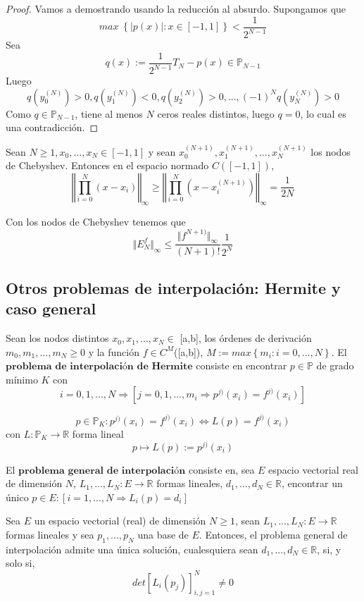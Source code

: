 \begin{proof}
Vamos a demostrando usando la reducción al absurdo. Supongamos que
\[ max \; \left\lbrace \vert p(x) \vert : x \in \left[ -1,1 \right] \right\rbrace < \frac{1}{2^{N-1}}\]
Sea
\[ q(x) := \frac{1}{2^{N-1}} T_N - p(x) \in \mathbb{P}_{N-1} \]
Luego
\[ q(y_0^{(N)}) >0, q(y_1^{(N)})<0, q(y_2^{(N)})>0, ..., (-1)^Nq(y_N^{(N)})>0 \]
Como $q \in \mathbb{P}_{N-1}$, tiene al menos $N$ ceros reales distintos, luego $q=0$, lo cual es una contradicción.
\end{proof}

\begin{ncor}
Sean $N \geq 1, x_0,...,x_N \in \left[ -1,1 \right]$ y sean $x_0^{(N+1)}, x_1^{(N+1)},...,x_N^{(N+1)}$ los nodos de Chebyshev. Entonces en el espacio normado $C( \left[ -1,1 \right] )$,
\[ \left\Vert \prod_{i=0}^N (x-x_i) \right\Vert _\infty \geq \left\Vert \prod_{i=0}^N (x-x_i^{(N+1)} ) \right\Vert _\infty = \frac{1}{2N} \]
\end{ncor}

Con los nodos de Chebyshev tenemos que
\[ \Vert E_N^f \Vert _\infty \leq \frac{\Vert f^{N+1)} \Vert _\infty}{(N+1)!} \frac{1}{2^N} \]

\subsection{Otros problemas de interpolación: Hermite y caso general}
Sean los nodos distintos $x_0,x_1,...,x_N \in$ [a,b], los órdenes de derivación $m_0,m_1,...,m_N \geq 0$ y la función $f \in C^M$([a,b]), $M:= max \left\lbrace m_i : i=0,...,N \right\rbrace$. El $\textbf{problema de interpolación de Hermite}$ consiste en encontrar $p \in \mathbb{P}$ de grado mínimo $K$ con
\[ i=0,1,...,N \Rightarrow \left[ j=0,1,...,m_i \Rightarrow p^{j)}(x_i) = f^{j)}(x_i) \right] \]

\[ p \in \mathbb{P} _K : p^{j)}(x_i) = f^{j)}(x_i) \Leftrightarrow L(p) = f^{j)}(x_i) \]
con $L : \mathbb{P} _K \longrightarrow \mathbb{R}$ forma lineal
\[ p \mapsto L(p) := p^{j)}(x_i) \]

El $\textbf{problema general de interpolación}$ consiste en, sea $E$ espacio vectorial real de dimensión $N$, $L_1,...,L_N : E \longrightarrow \mathbb{R}$ formas lineales, $d_1,...,d_N \in \mathbb{R}$, encontrar un único $p \in E : \left[  i=1,...,N \Rightarrow L_i(p) = d_i \right] $

\begin{nprop}
Sea $E$ un espacio vectorial (real) de dimensión $N \geq 1$, sean $L_1,...,L_N : E \longrightarrow \mathbb{R}$ formas lineales y sea {$p_1,...,p_N$} una base de $E$. Entonces, el problema general de interpolación admite una única solución, cualesquiera sean $d_1,...,d_N \in \mathbb{R}$, si, y solo si,
\[ det \left[ L_i(p_j) \right] _{i,j=1}^N \neq 0 \]
\end{nprop}

